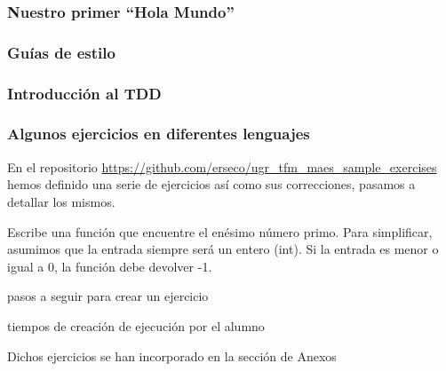 \subsubsection{Nuestro primer ``Hola Mundo''}
\subsubsection{Guías de estilo}
\subsubsection{Introducción al TDD}
\subsubsection{Algunos ejercicios en diferentes lenguajes}

En el repositorio \url{https://github.com/erseco/ugr_tfm_maes_sample_exercises} hemos definido una serie de ejercicios así como sus correcciones, pasamos a detallar los mismos.


Escribe una función que encuentre el enésimo número primo. Para simplificar, asumimos que la entrada siempre será un entero (int). Si la entrada es menor o igual a 0, la función debe devolver -1.

pasos a seguir para crear un ejercicio

tiempos de creación de ejecución por el alumno

Dichos ejercicios se han incorporado en la sección de Anexos